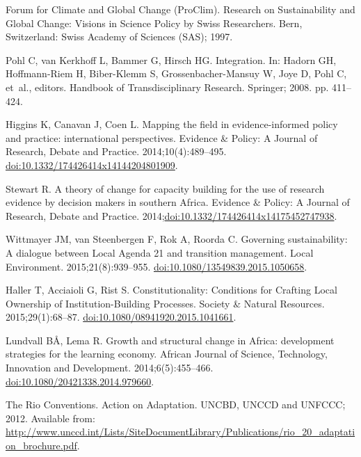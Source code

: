 \documentclass[10pt,a4paper]{article}
\begin{document}
\begin{multicols}{2}
\begin{footnotesize}
\begin{thebibliography}{10}
Forum for Climate and Global Change (ProClim).
\newblock Research on Sustainability and Global Change: Visions in Science
  Policy by Swiss Researchers. Bern, Switzerland: Swiss Academy of Sciences
  (SAS); 1997.

Pohl C, van Kerkhoff L, Bammer G, Hirsch HG.
\newblock Integration.
\newblock In: Hadorn GH, Hoffmann-Riem H, Biber-Klemm S, Grossenbacher-Mansuy
  W, Joye D, Pohl C, et~al., editors. Handbook of Transdisciplinary Research.
  Springer; 2008. pp. 411--424.

Higgins K, Canavan J, Coen L.
\newblock Mapping the field in evidence-informed policy and practice:
  international perspectives.
\newblock Evidence {\&} Policy: A Journal of Research, Debate and Practice.
  2014;10(4):489--495.
\newblock
  \href{https://doi.org/10.1332/174426414x14144204801909}{doi:10.1332/174426414x14144204801909}.

Stewart R.
\newblock A theory of change for capacity building for the use of research
  evidence by decision makers in southern Africa.
\newblock Evidence {\&} Policy: A Journal of Research, Debate and Practice.
  2014;\href{https://doi.org/10.1332/174426414x14175452747938}{doi:10.1332/174426414x14175452747938}.

Wittmayer JM, van Steenbergen F, Rok A, Roorda C.
\newblock Governing sustainability: A dialogue between Local Agenda 21 and
  transition management.
\newblock Local Environment. 2015;21(8):939--955.
\newblock
  \href{https://doi.org/10.1080/13549839.2015.1050658}{doi:10.1080/13549839.2015.1050658}.

Haller T, Acciaioli G, Rist S.
\newblock Constitutionality: Conditions for Crafting Local Ownership of
  Institution-Building Processes.
\newblock Society {\&} Natural Resources. 2015;29(1):68--87.
\newblock
  \href{https://doi.org/10.1080/08941920.2015.1041661}{doi:10.1080/08941920.2015.1041661}.

Lundvall B{\AA}, Lema R.
\newblock Growth and structural change in Africa: development strategies for
  the learning economy.
\newblock African Journal of Science, Technology, Innovation and Development.
  2014;6(5):455--466.
\newblock
  \href{https://doi.org/10.1080/20421338.2014.979660}{doi:10.1080/20421338.2014.979660}.

The Rio Conventions. Action on Adaptation.
\newblock UNCBD, UNCCD and UNFCCC; 2012.
\newblock Available from:
  \url{http://www.unccd.int/Lists/SiteDocumentLibrary/Publications/rio_20_adaptation_brochure.pdf}.


\end{thebibliography}
\end{footnotesize}
\end{multicols}
\end{document}
